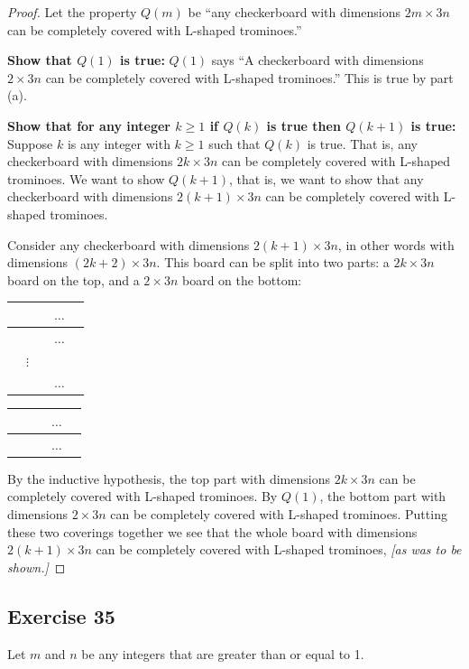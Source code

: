\documentclass[14pt]{extarticle}
\begin{document}
\begin{proof}
Let the property $Q(m)$ be ``any checkerboard with dimensions $2m \times 3n$ can be completely covered with L-shaped trominoes.''

{\bf Show that $Q(1)$ is true:} $Q(1)$ says ``A checkerboard with dimensions $2 \times 3n$ can be completely covered with L-shaped trominoes.'' This is true by part (a).

{\bf Show that for any integer $k \geq 1$ if $Q(k)$ is true then $Q(k+1)$ is true:} Suppose $k$ is any integer with $k \geq 1$ such that $Q(k)$ is true. That is, any checkerboard with dimensions $2k \times 3n$ can be completely covered with L-shaped trominoes. We want to show $Q(k+1)$, that is, we want to show that any checkerboard with dimensions $2(k+1) \times 3n$ can be completely covered with L-shaped trominoes.

Consider any checkerboard with dimensions $2(k+1) \times 3n$, in other words with dimensions $(2k+2) \times 3n$. This board can be split into two parts: a $2k \times 3n$ board on the top, and a $2 \times 3n$ board on the bottom:

\begin{center}
\begin{tabular}{|c|c|c|c|c|}
\hline
 &  &  & $\ldots$ &  \\
\hline
 &  &  & $\ldots$ &  \\
\hline
 & $\vdots$ &  &  &  \\
\hline
 &  &  & $\ldots$ &  \\
\hline
\end{tabular}

\begin{tabular}{|c|c|c|c|c|}
\hline
 &  &  & $\ldots$ &  \\
\hline
 &  &  & $\ldots$ &  \\
\hline
\end{tabular}
\end{center}

By the inductive hypothesis, the top part with dimensions $2k \times 3n$ can be completely covered with L-shaped trominoes. By $Q(1)$, the bottom part with dimensions $2 \times 3n$ can be completely covered with L-shaped trominoes. Putting these two coverings together we see that the whole board with dimensions $2(k+1) \times 3n$ can be completely covered with L-shaped trominoes, {\it [as was to be shown.]}
\end{proof}

\subsection{Exercise 35}
Let $m$ and $n$ be any integers that are greater than or equal to 1.
\end{document}
